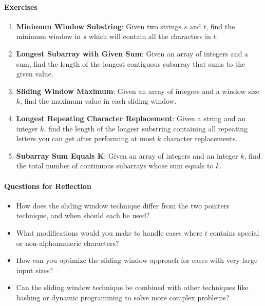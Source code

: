\paragraph*{Exercises}

\begin{enumerate}
    \item \textbf{Minimum Window Substring}: Given two strings \(s\) and \(t\), find the minimum window in \(s\) which will contain all the characters in \(t\).
    
    \item \textbf{Longest Subarray with Given Sum}: Given an array of integers and a sum, find the length of the longest contiguous subarray that sums to the given value.
    
    \item \textbf{Sliding Window Maximum}: Given an array of integers and a window size \(k\), find the maximum value in each sliding window.
    
    \item \textbf{Longest Repeating Character Replacement}: Given a string and an integer \(k\), find the length of the longest substring containing all repeating letters you can get after performing at most \(k\) character replacements.
    
    \item \textbf{Subarray Sum Equals K}: Given an array of integers and an integer \(k\), find the total number of continuous subarrays whose sum equals to \(k\).
\end{enumerate}

\paragraph*{Questions for Reflection}

\begin{itemize}
    \item How does the sliding window technique differ from the two pointers technique, and when should each be used?
    \item What modifications would you make to handle cases where \(t\) contains special or non-alphanumeric characters?
    \item How can you optimize the sliding window approach for cases with very large input sizes?
    \item Can the sliding window technique be combined with other techniques like hashing or dynamic programming to solve more complex problems?
\end{itemize}

